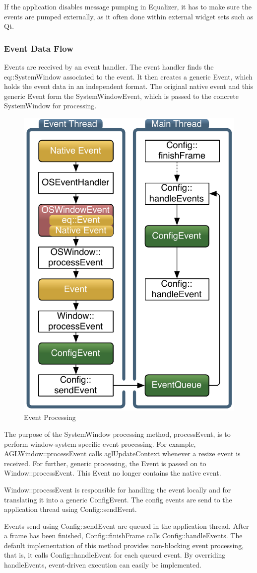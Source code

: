 \documentclass[10pt,a4]{scrartcl}
\begin{document}
If the application disables message pumping in Equalizer, it has to make
sure the events are pumped externally, as it often done within external
widget sets such as Qt.

\subsubsection{Event Data Flow}

Events are received by an event handler. The event handler finds the
\textsf{eq::SystemWindow} associated to the event. It then creates a generic
\textsf{Event}, which holds the event data in an independent
format. The original native event and this generic \textsf{Event}
form the \textsf{SystemWindowEvent}, which is passed to the concrete
\textsf{SystemWindow} for processing.

\begin{figure}
  \includegraphics[width=.382\textwidth]{images/eventFilter.pdf}
  {\caption{\label{fEventProcessing}Event Processing}}
\end{figure}
The purpose of the \textsf{SystemWindow} processing method,
\textsf{processEvent}, is to perform window-system specific event
processing. For example, \textsf{AGLWindow::processEvent} calls
\textsf{aglUpdateContext} whenever a resize event is received. For
further, generic processing, the \textsf{Event} is passed on to
\textsf{Window::processEvent}. This \textsf{Event} no longer contains
the native event.

\textsf{Window::processEvent} is responsible for handling
the event locally and for translating it into a generic
\textsf{ConfigEvent}. The config events are send to the application
thread using \textsf{Config::sendEvent}. 

Events send using \textsf{Config::sendEvent} are queued in the
application thread. After a frame has been finished,
\textsf{Config::finishFrame} calls \textsf{Config::handleEvents}. The
default implementation of this method provides non-blocking event
processing, that is, it calls \textsf{Config::handleEvent} for each
queued event. By overriding \textsf{handleEvents}, event-driven
execution can easily be implemented.
\end{document}
